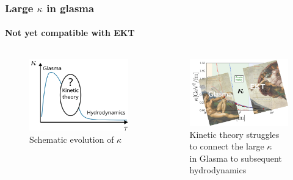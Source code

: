 \documentclass[aspectratio=169,11pt,usenames,dvipsnames]{beamer}
\begin{document}

\begin{frame}[noframenumbering]
    \frametitle{Large $\kappa$ in glasma}
    \framesubtitle{Not yet compatible with EKT}
    \vspace{-0.4cm}
    \begin{columns}[onlytextwidth,t]
        \begin{figure}[!hbt]
            \centering
            \captionsetup{justification=centering}
            \caption{Schematic evolution of $\kappa$}\vspace{-0.3cm}
            \includegraphics[width=0.78\columnwidth]{images/kappa_schematic.png}\vspace{-0.3cm}
        \end{figure}
        \begin{figure}[!hbt]
            \centering
            \captionsetup{justification=centering}
            \caption{{\color{ForestGreen}Kinetic theory} struggles to connect the large $\kappa$\\ in {\color{Dandelion}Glasma} to subsequent {\color{Periwinkle}hydrodynamics}}\vspace{-0.2cm}
            \includegraphics[width=0.9\columnwidth]{images/kappa_glasma_ekt.png}

\end{figure}
\end{columns}
\end{frame}
\end{document}
